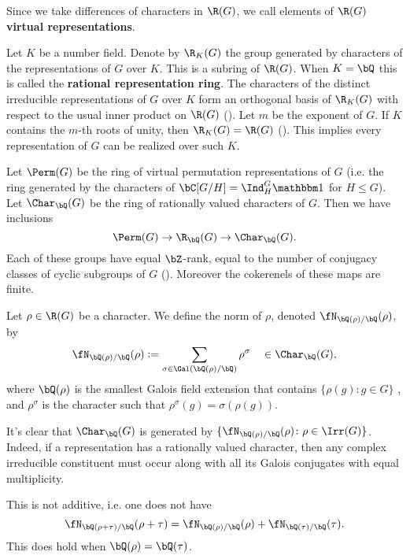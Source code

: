 Since we take differences of characters in $\R(G)$, we call elements of $\R(G)$ \textbf{virtual representations}. 

Let $K$ be a number field. Denote by $\R_K(G)$ the group generated by characters of the representations of $G$ over $K$. This is a subring of $\R(G)$.
When $K = \bQ$ this is called the \textbf{rational representation ring}.
The characters of the distinct irreducible representations of $G$ over $K$ form an orthogonal basis of $\R_K(G)$ with respect to the usual inner product on $\R(G)$ (\cite[Proposition 32]{Serre}).
Let $m$ be the exponent of $G$. If $K$ contains the $m$-th roots of unity, then $\R_K(G) = \R(G)$ (\cite[Theorem 24]{Serre}). This implies every representation of $G$ can be realized over such $K$. 
\vspace{1em}

Let $\Perm(G)$ be the ring of virtual permutation representations of $G$ (i.e. the ring generated by the characters of $\bC[G / H] = \Ind_{H}^G \trivial$ for $H \leq G$). Let $\Char_{\bQ}(G)$ be the ring of rationally valued characters of $G$. Then we have inclusions 
\[ \Perm(G) \to \R_{\bQ}(G) \to \Char_{\bQ}(G). \]
Each of these groups have equal $\bZ$-rank, equal to the number of conjugacy classes of cyclic subgroups of $G$ (\cite[Chapter 13, \S13.1]{Serre}). Moreover the cokerenels of these maps are finite.

\begin{defn}\label{rho-norm}
    Let $\rho \in \R(G)$ be a character. We define the norm of $\rho$, denoted $\repnorm{\rho}$, by 
    \[
    \repnorm{\rho} \defeq \sum_{\sigma \in \Gal(\bQ(\rho)/\bQ)}  \rho^\sigma \quad \in \Char_{\bQ}(G),
    \]
    where $\bQ(\rho)$ is the smallest Galois field extension that contains $ \{\rho(g) \colon g \in G \}$ , and $\rho^\sigma$ is the character such that $\rho^\sigma(g) = \sigma(\rho(g))$.
\end{defn}

It's clear that $\Char_{\bQ}(G)$ is generated by $\{ \repnorm{\rho} \colon \rho \in \Irr(G) \}$. Indeed, if a representation has a rationally valued character, then any complex irreducible constituent must occur along with all its Galois conjugates with equal multiplicity.

\begin{rem}
This is not additive, i.e. one does not have \[\repnorm{\rho + \tau} = \repnorm{\rho} + \repnorm{\tau}. \] 
This does hold when $\bQ(\rho) = \bQ(\tau)$. 
\end{rem}

